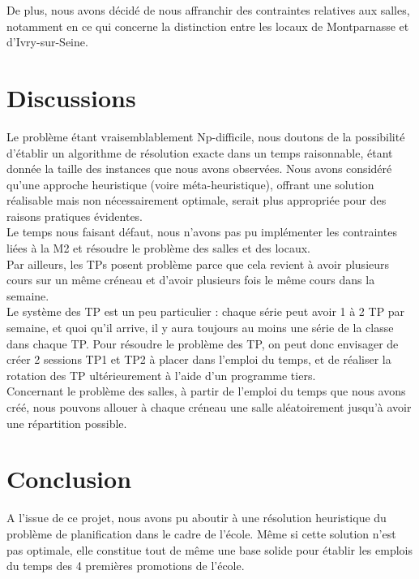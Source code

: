 \documentclass[12pt,a4paper,french]{article}
\begin{document}
De plus, nous avons décidé de nous affranchir des contraintes relatives aux salles, notamment en ce qui concerne la distinction entre les locaux de Montparnasse et d'Ivry-sur-Seine.\\

\newpage



\section{Discussions}

Le problème étant vraisemblablement Np-difficile, nous doutons de la possibilité d'établir un algorithme de résolution exacte dans un temps raisonnable, étant donnée la taille des instances que nous avons observées. Nous avons considéré qu'une approche heuristique (voire méta-heuristique), offrant une solution réalisable mais non nécessairement optimale, serait plus appropriée pour des raisons pratiques évidentes.\\

Le temps nous faisant défaut, nous n'avons pas pu implémenter les contraintes liées à la M2 et résoudre le problème des salles et des locaux.\\

Par ailleurs, les TPs posent problème parce que cela revient à avoir plusieurs cours sur un même créneau et d'avoir plusieurs fois le même cours dans la semaine.\\
Le système des TP est un peu particulier : chaque série peut avoir 1 à 2 TP par semaine, et quoi qu'il arrive, il y aura toujours au moins une série de la classe dans chaque TP. Pour résoudre le problème des TP, on peut donc envisager de créer 2 sessions TP1 et TP2 à placer dans l'emploi du temps, et de réaliser la rotation des TP ultérieurement à l'aide d'un programme tiers.\\

Concernant le problème des salles, à partir de l'emploi du temps que nous avons créé, nous pouvons allouer à chaque créneau une salle aléatoirement jusqu'à avoir une répartition possible.\\


\newpage
\section{Conclusion}

A l'issue de ce projet, nous avons pu aboutir à une résolution heuristique du problème de planification dans le cadre de l'école.
Même si cette solution n'est pas optimale, elle constitue tout de même une base solide pour établir les emplois du temps des 4 premières promotions de l'école.\\
\end{document}
